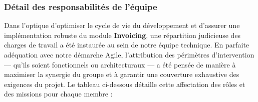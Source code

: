 \documentclass[12pt, a4paper, openany]{report}
\begin{document}
\subsubsection{Détail des responsabilités de l'équipe}

\vspace{-0.4cm}
Dans l'optique d'optimiser le cycle de vie du développement et d'assurer une implémentation robuste du module \textbf{Invoicing}, une répartition judicieuse des charges de travail a été instaurée au sein de notre équipe technique. En parfaite adéquation avec notre démarche Agile, l'attribution des périmètres d'intervention — qu'ils soient fonctionnels ou architecturaux — a été pensée de manière à maximiser la synergie du groupe et à garantir une couverture exhaustive des exigences du projet. Le tableau ci-dessous détaille cette affectation des rôles et des missions pour chaque membre :

\vspace{0.4cm}
\end{document}
